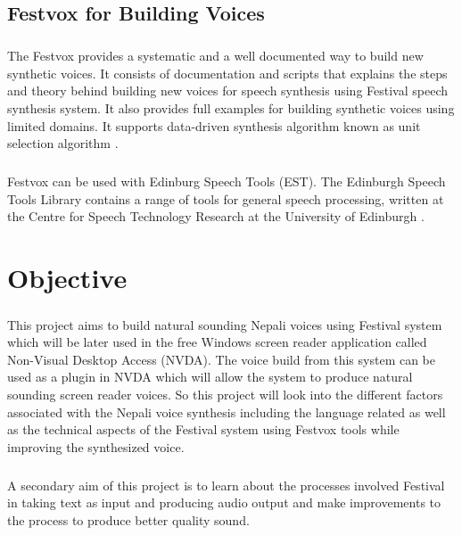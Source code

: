 \documentclass{report}
\begin{document}
		\section{Festvox for Building Voices}
		\paragraph{}
			The Festvox provides a systematic and a well documented way to build new synthetic voices. It consists of documentation and scripts that explains the steps and theory behind building new voices for speech synthesis using Festival speech synthesis system. It also provides full examples for building synthetic voices using limited domains. It supports data-driven synthesis algorithm known as unit selection algorithm  \cite{UNITSEL:4}. 
		\paragraph{}
	Festvox can be used with Edinburg Speech Tools (EST). The Edinburgh Speech Tools Library contains a range of tools for general speech processing, written at the Centre for Speech Technology Research at the University of Edinburgh \cite{FESTVOX:3}.

	\chapter{Objective}
		\paragraph{}
			This project aims to build natural sounding Nepali voices using Festival system which will be later used in the free Windows screen reader application called Non-Visual Desktop Access (NVDA). The voice build from this system can be used as a plugin in NVDA which will allow the system to produce natural sounding screen reader voices. So this project will look into the different factors associated with the Nepali voice synthesis including the language related as well as the technical aspects of the Festival system using Festvox tools while improving the synthesized voice.
		\paragraph{}
			A secondary aim of this project is to learn about the processes involved Festival in taking text as input and producing audio output and make improvements to the process to produce better quality sound.
\end{document}
